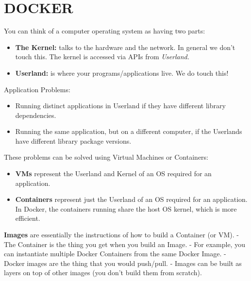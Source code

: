 \section{DOCKER}

You can think of a computer operating system as having two parts:
\vspace{-3.5mm}
\begin{itemize}
\item
\textbf{The Kernel:} talks to the hardware and the network. In general we don't touch this.\newline
The kernel is accessed via APIs from \textit{Userland.}
\vspace{-1.0mm}
\item
\textbf{Userland:} is where your programs/applications live. We do touch this!
\end{itemize}

Application Problems:
\vspace{-3.5mm}
\begin{itemize}
\item
Running distinct applications in Userland if they have different library dependencies.
\vspace{-1.0mm}
\item
Running the same application, but on a different computer,
if the Userlands have different library package versions.
\end{itemize}

These problems can be solved using Virtual Machines or Containers:
\vspace{-3.5mm}
\begin{itemize}
\item
\textbf{VMs} represent the Userland and Kernel of an OS required for an application.
\vspace{-1.0mm}
\item
\textbf{Containers} represent just the Userland of an OS required for an application.\newline
In Docker, the containers running share the host OS kernel, which is more efficient.
\end{itemize}

\textbf{Images} are essentially the instructions of how to build a Container (or VM).\newline
- The Container is the thing you get when you build an Image.\newline
- For example, you can instantiate multiple Docker Containers from the same Docker Image.\newline
- Docker images are the thing that you would push/pull.\newline
- Images can be built as layers on top of other images (you don't build them from scratch).

